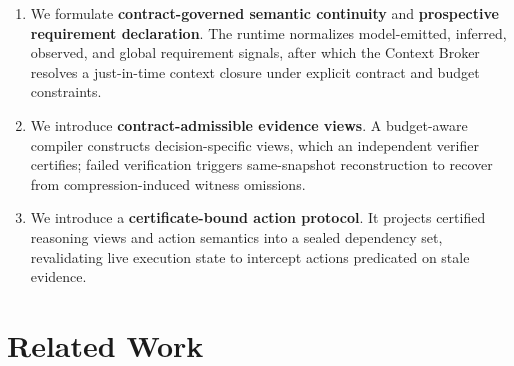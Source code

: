 \begin{enumerate}
    \item We formulate \textbf{contract-governed semantic continuity} and \textbf{prospective requirement declaration}. The runtime normalizes model-emitted, inferred, observed, and global requirement signals, after which the Context Broker resolves a just-in-time context closure under explicit contract and budget constraints.
    \item We introduce \textbf{contract-admissible evidence views}. A budget-aware compiler constructs decision-specific views, which an independent verifier certifies; failed verification triggers same-snapshot reconstruction to recover from compression-induced witness omissions.
    \item We introduce a \textbf{certificate-bound action protocol}. It projects certified reasoning views and action semantics into a sealed dependency set, revalidating live execution state to intercept actions predicated on stale evidence.
\end{enumerate}
\section{Related Work}
